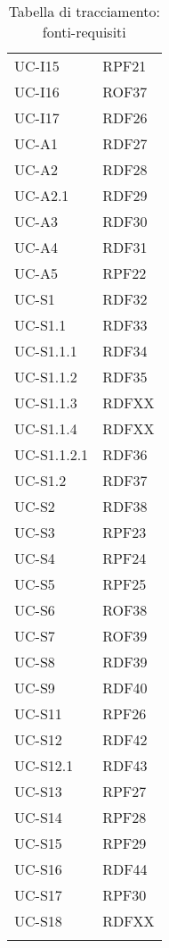 \begin{longtable}{| p{5cm} | p{5cm} |}
		\rowcolor{LightGray}
		UC-I15 & RPF21 \\
		UC-I16 & ROF37 \\
		\rowcolor{LightGray}
		UC-I17 & RDF26\\		
		UC-A1 & RDF27\\
		\rowcolor{LightGray}
		UC-A2 & RDF28 \\
		UC-A2.1 & RDF29 \\
		\rowcolor{LightGray}
		UC-A3 & RDF30\\
		UC-A4 & RDF31 \\
		\rowcolor{LightGray}
		UC-A5 & RPF22\\
		UC-S1 & RDF32 \\
		\rowcolor{LightGray}
		UC-S1.1 & RDF33\\
		UC-S1.1.1 & RDF34\\
		\rowcolor{LightGray}
		UC-S1.1.2 & RDF35\\
		UC-S1.1.3 & RDFXX\\%
		\rowcolor{LightGray}
		UC-S1.1.4 & RDFXX\\%
		UC-S1.1.2.1 & RDF36\\
		\rowcolor{LightGray}
		UC-S1.2 & RDF37\\
		UC-S2 & RDF38\\
		\rowcolor{LightGray}
		UC-S3 & RPF23\\
		UC-S4 & RPF24\\
		\rowcolor{LightGray}
		UC-S5 & RPF25 \\
		UC-S6 & ROF38 \\
		\rowcolor{LightGray}
		UC-S7 & ROF39 \\
		UC-S8 & RDF39 \\
		\rowcolor{LightGray}
		UC-S9 & RDF40 \\
		\rowcolor{LightGray}
		UC-S11 & RPF26 \\
		UC-S12 & RDF42 \\
		\rowcolor{LightGray}
		UC-S12.1 & RDF43 \\
		UC-S13 & RPF27 \\
		\rowcolor{LightGray}
		UC-S14 & RPF28 \\
		UC-S15 & RPF29 \\
		\rowcolor{LightGray} 
		UC-S16 & RDF44\\
		UC-S17 & RPF30\\
		\rowcolor{LightGray}		
		UC-S18 & RDFXX\\%
		\hline
		\caption{Tabella di tracciamento: fonti-requisiti}
\end{longtable}
